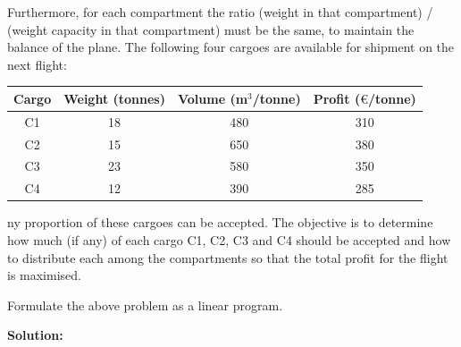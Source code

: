 \documentclass[a4paper,10pt]{article}
\begin{document}
Furthermore, for each compartment the ratio (weight in that compartment) / (weight capacity
in that compartment) must be the same, to maintain the balance of the plane.
The following four cargoes are available for shipment on the next flight:

\begin{table}[H]
\centering
\begin{tabular}{|c|c|c|c|}
\hline
Cargo & Weight (tonnes) & Volume (m$^3$/tonne) & Profit ($\euro$/tonne) \\
\hline
C1 & 18 & 480 & 310 \\
\hline
C2 & 15 & 650 & 380 \\
\hline
C3 & 23 & 580 & 350 \\
\hline
C4 & 12 & 390 & 285 \\
\hline
\end{tabular}
\end{table}

ny proportion of these cargoes can be accepted. The objective is to determine how much (if
any) of each cargo C1, C2, C3 and C4 should be accepted and how to distribute each among
the compartments so that the total profit for the flight is maximised.


Formulate the above problem as a linear program.

\medskip
\textbf{Solution:}
\end{document}
